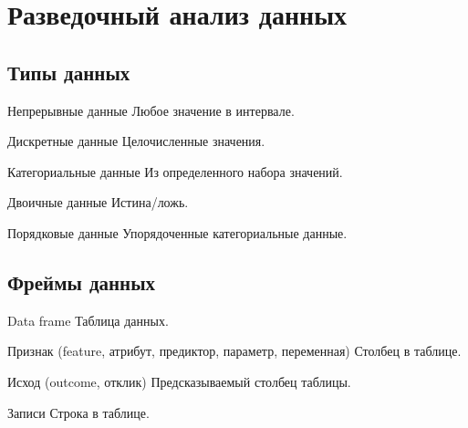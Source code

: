 \section{Разведочный анализ данных}

\subsection{Типы данных}
\begin{terms}
    \item[Непрерывные данные] Любое значение в интервале.
    \item[Дискретные данные] Целочисленные значения.
    \item[Категориальные данные] Из определенного набора значений.
    \item[Двоичные данные] Истина/ложь.
    \item[Порядковые данные] Упорядоченные категориальные данные.
\end{terms}

\subsection{Фреймы данных}
\begin{terms}
    \item[Data frame] Таблица данных.
    \item[Признак (feature, атрибут, предиктор, параметр, переменная)] Столбец в таблице.
    \item[Исход (outcome, отклик)] Предсказываемый столбец таблицы.
    \item[Записи] Строка в таблице.
\end{terms}

